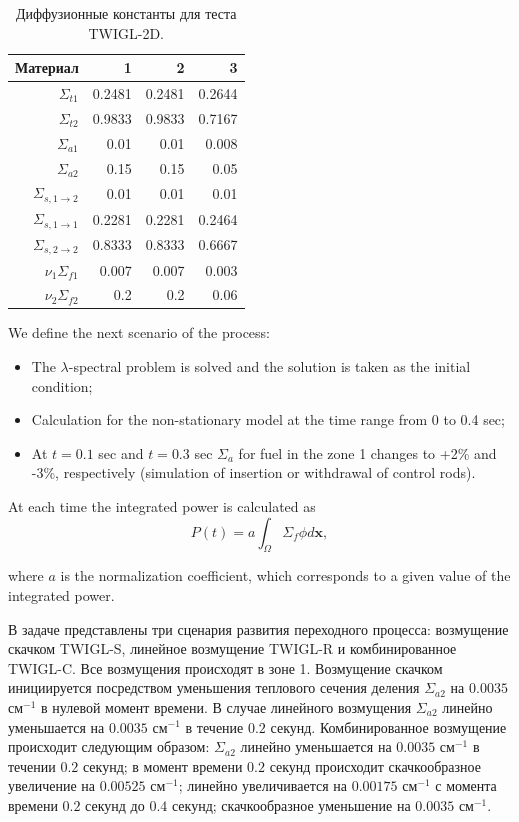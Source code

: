 \documentclass{crm-article}
\begin{document}
\begin{table}[htp]
\caption{\label{table:coeff}Диффузионные константы для теста TWIGL-2D.}
\label{t1}
\begin{center}
\begin{tabular}{rrrr}
\hline
Материал & 1 & 2 & 3\\
\hline 
$\Sigma_{t1}$ & 0.2481 & 0.2481 & 0.2644 \\
$\Sigma_{t2}$ & 0.9833 & 0.9833 & 0.7167 \\
$\Sigma_{a1}$ & 0.01 & 0.01 & 0.008\\
$\Sigma_{a2}$ & 0.15 & 0.15 & 0.05\\
$\Sigma_{s,1\rightarrow2}$ & 0.01 & 0.01  & 0.01\\
$\Sigma_{s,1\rightarrow1}$ & 0.2281 & 0.2281 & 0.2464\\
$\Sigma_{s,2\rightarrow2}$ & 0.8333 & 0.8333 & 0.6667\\
$\nu_1\Sigma_{f1}$ & 0.007 & 0.007 & 0.003\\
$\nu_2\Sigma_{f2}$ & 0.2 & 0.2 & 0.06\\
\hline
\end{tabular}
\end{center}
\end{table}

We define the next scenario of the process:
\begin{itemize}
\item The $\lambda$-spectral problem is solved and the solution is taken as the initial condition;
\item Calculation for the non-stationary model at the time range from 0 to 0.4 sec;
\item At $t=0.1$ sec and $t=0.3$ sec $\Sigma_a$ for fuel in the zone 1 changes to +2\% and -3\%, respectively (simulation of insertion or withdrawal of control rods).
\end{itemize}
At each time the integrated power is calculated as
\begin{equation}\label{13}
P(t) = a\int_{\Omega}\Sigma_f \phi d\bm x,
\end{equation}

where $a$ is the normalization coefficient, which corresponds to a given value of the integrated power.

В задаче представлены три сценария развития переходного процесса: возмущение скачком TWIGL-S, линейное возмущение TWIGL-R и комбинированное TWIGL-C. Все возмущения происходят в зоне 1.
Возмущение скачком инициируется посредством уменьшения теплового сечения деления $\Sigma_{a2}$ на $0.0035$ см$^{-1}$ в нулевой момент времени. 
В случае линейного возмущения $\Sigma_{a2}$ линейно уменьшается на $0.0035$ см$^{-1}$ в течение $0.2$ секунд.
Комбинированное возмущение происходит следующим образом:
$\Sigma_{a2}$ линейно уменьшается на $0.0035$ см$^{-1}$ в течении $0.2$ секунд; в момент времени $0.2$ секунд происходит скачкообразное увеличение на $0.00525$ см$^{-1}$; линейно увеличивается на $0.00175$ см$^{-1}$  с момента времени $0.2$ секунд до $0.4$ секунд;  скачкообразное уменьшение на $0.0035$ см$^{-1}$.
\end{document}

